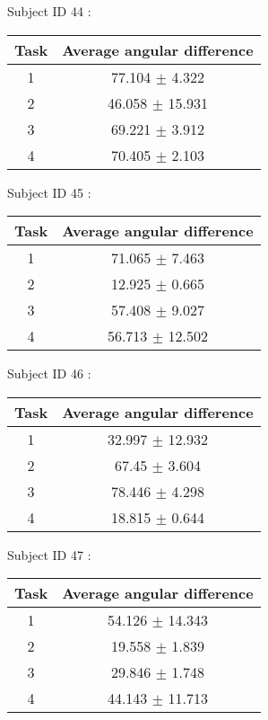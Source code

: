 \documentclass[12pt]{article}
\begin{document}
\par Subject ID  44 :
\begin{center}
\begin{tabular}{|c|c|}
\hline
 Task & Average angular difference \\ \hline
1  &  77.104 $\pm$ 4.322 \\
2  &  46.058 $\pm$ 15.931 \\
3  &  69.221 $\pm$ 3.912 \\
4  &  70.405 $\pm$ 2.103 \\
\hline
\end{tabular}
\end{center}

\par Subject ID  45 :
\begin{center}
\begin{tabular}{|c|c|}
\hline
 Task & Average angular difference \\ \hline
1  &  71.065 $\pm$ 7.463 \\
2  &  12.925 $\pm$ 0.665 \\
3  &  57.408 $\pm$ 9.027 \\
4  &  56.713 $\pm$ 12.502 \\
\hline
\end{tabular}
\end{center}

\par Subject ID  46 :
\begin{center}
\begin{tabular}{|c|c|}
\hline
 Task & Average angular difference \\ \hline
1  &  32.997 $\pm$ 12.932 \\
2  &  67.45 $\pm$ 3.604 \\
3  &  78.446 $\pm$ 4.298 \\
4  &  18.815 $\pm$ 0.644 \\
\hline
\end{tabular}
\end{center}

\par Subject ID  47 :
\begin{center}
\begin{tabular}{|c|c|}
\hline
 Task & Average angular difference \\ \hline
1  &  54.126 $\pm$ 14.343 \\
2  &  19.558 $\pm$ 1.839 \\
3  &  29.846 $\pm$ 1.748 \\
4  &  44.143 $\pm$ 11.713 \\
\hline
\end{tabular}
\end{center}
\end{document}
